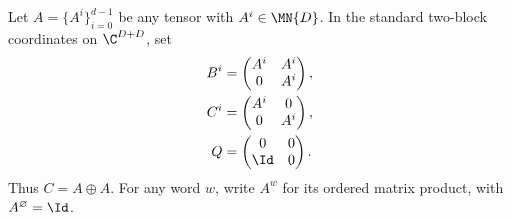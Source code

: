 \begin{definition}
    \label{def:asymex_jordan}
    \leanok
    Let $A=\{A^i\}_{i=0}^{d-1}$ be any tensor with $A^i\in\MN{D}$.
    In the standard two-block coordinates on $\C^{D+D}$, set
    \begin{align}
        B^i & =\begin{pmatrix}A^i&A^i\\0&A^i\end{pmatrix}, \\
        C^i & =\begin{pmatrix}A^i&0\\0&A^i\end{pmatrix},   \\
        Q   & =\begin{pmatrix}0&0\\\Id&0\end{pmatrix}.
    \end{align}
    Thus $C=A\oplus A$. For any word $w$, write $A^w$ for its
    ordered matrix product, with $A^\varnothing=\Id$.
\end{definition}

